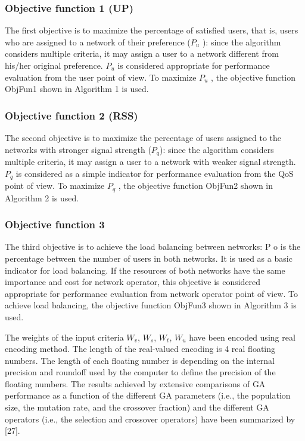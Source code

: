 \subsubsection{Objective function 1 (UP)}
The first objective is to maximize the percentage of satisfied users,
	that is,
	users who are assigned to a network of their preference ($P_{u}$ ):
	since the algorithm considers multiple criteria,
	it may assign a user to a network different from his/her original preference.
$P_{u}$ is considered appropriate for performance evaluation from the user point of view.
To maximize $P_{u}$ ,
	the objective function ObjFun1 shown in Algorithm 1 is used.

\subsubsection{Objective function 2 (RSS)}
The second objective is to maximize the percentage of users assigned to the networks with stronger signal strength ($P_{q}$):
	since the algorithm considers multiple criteria,
	it may assign a user to a network with weaker signal strength.
$P_{q}$ is considered as a simple indicator for performance evaluation from the QoS point of view.
To maximize $P_{q}$ ,
	the objective function ObjFun2 shown in Algorithm 2 is used.

\subsubsection{Objective function 3}
The third objective is to achieve the load balancing between networks:
	P o is the percentage between the number of users in both networks.
It is used as a basic indicator for load balancing.
If the resources of both networks have the same importance and cost for network operator,
	this objective is considered appropriate for performance evaluation from network operator point of view.
To achieve load balancing,
	the objective function ObjFun3 shown in Algorithm 3 is used.



The weights of the input criteria {$W_{v}$,
	$W_{s}$,
	$W_{t}$,
	$W_{u}$} have been encoded using real encoding method.
The length of the real-valued encoding is 4 real floating numbers.
The length of each floating number is depending on the internal precision and roundoff used by the computer to define the precision of the floating numbers.
The results achieved by extensive comparisons of GA performance as a function of the different GA parameters (i.e.,
	the population size,
	the mutation rate,
	and the crossover fraction) and the different GA operators (i.e.,
	the selection and crossover operators) have been summarized by [27].


